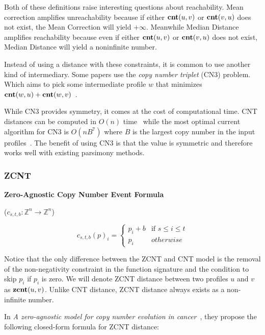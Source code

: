 \vspace{15pt}

Both of these definitions raise interesting questions about reachability. Mean correction amplifies unreachability because if either $\textbf{cnt}(u, v)$ or $\textbf{cnt}(v, u)$ does not exist, the Mean Correction will yield $+\infty$. Meanwhile Median Distance amplifies reachability because even if either $\textbf{cnt}(u, v)$ or $\textbf{cnt}(v, u)$ does not exist, Median Distance will yield a noninfinite number. 

Instead of using a distance with these constraints, it is common to use another kind of intermediary. Some papers use the {\it copy number triplet\/} (CN3) problem. Which aims to pick some intermediate profile $w$ that minimizes $\textbf{cnt}(w, u) + \textbf{cnt} (w, v)$~\cite{triplet_algorithm}. 

While CN3 provides symmetry, it comes at the cost of computational time. CNT distances can be computed in $O(n)$ time~\cite{linear_cnt} while the most optimal current algorithm for CN3 is $O(nB^7)$ where $B$ is the largest copy number in the input profiles~\cite{triplet_algorithm}. The benefit of using CN3 is that the value is symmetric and therefore works well with existing parsimony methods.

\subsubsection{ZCNT}

{\bf Zero-Agnostic Copy Number Event Formula} 

($c_{s, t, b}: \mathbb{Z}^n \rightarrow \mathbb{Z}^n$) 

\begin{equation}
    c_{s, t, b}{(p)}_i = \begin{cases}
        p_i + b & \text{if } s \leq i \leq t \\ 
        p_i & otherwise
    \end{cases}
\end{equation}

Notice that the only difference between the ZCNT and CNT model is the removal of the non-negativity constraint in the function signature and the condition to skip $p_i$ if $p_i$ is zero. We will denote ZCNT distance between two profiles $u$ and $v$ as $\textbf{zcnt}(u, v)$. Unlike CNT distance, ZCNT distance always exists as a non-infinite number. 

In {\it A zero-agnostic model for copy number evolution in cancer\/}~\cite{zcnt_paper}, they propose the following closed-form formula for ZCNT distance: 

